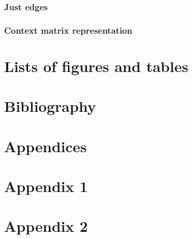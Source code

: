 \documentclass{article}
\begin{document}
  \subsubsection{Just edges}
  
  \subsubsection{Context matrix representation}
 
 \section{Lists of figures and tables}
 
 \newpage
 \listoffigures
 \listoftables
 
 \section{Bibliography} %
 
 \newpage
 
 {}
 
 
 \newpage
 \section{Appendices}
 \begin{appendices}
  \section*{Appendix 1}
  \section*{Appendix 2}
 \end{appendices}
 
 
\end{document}
